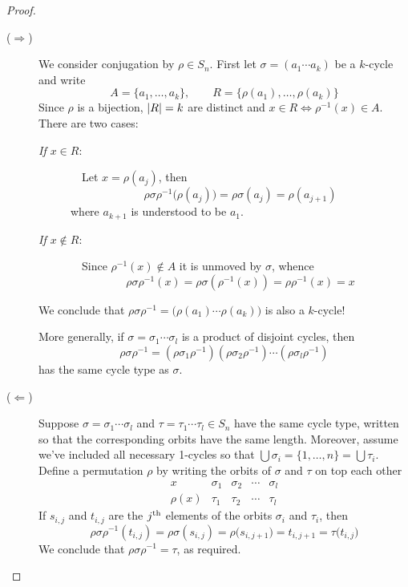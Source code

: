 \begin{proof}
\begin{description}
	\item[\normalfont($\Rightarrow$)] We consider conjugation by $\rho\in S_n$. First let $\sigma=(a_1\cdots a_k)$ be a $k$-cycle and write
	\[A=\{a_1,\ldots,a_k\},\qquad R=\{\rho(a_1),\ldots,\rho(a_k)\}\]
	Since $\rho$ is a bijection, $\left| R\right|=k$ are distinct and $x\in R\iff \rho^{-1}(x)\in A$. There are two cases:
	\begin{description}
		\item[\normalfont\emph{If $x\in R$}:] \ \ Let $x=\rho(a_j)$, then
		\[\rho\sigma\rho^{-1}\bigl(\rho(a_j)\bigr)=\rho\sigma(a_j)=\rho(a_{j+1})\]
		where $a_{k+1}$ is understood to be $a_1$.
		\item[\normalfont\emph{If $x\not\in R$}:] \ \ Since $\rho^{-1}(x)\not\in A$ it is unmoved by $\sigma$, whence
		\[\rho\sigma\rho^{-1}(x) =\rho\sigma(\rho^{-1}(x))=\rho\rho^{-1}(x)=x\]
	\end{description}
	We conclude that $\rho\sigma\rho^{-1}=\bigl(\rho(a_1)\cdots\rho(a_k)\bigr)$	is also a $k$-cycle!\par
	More generally, if $\sigma=\sigma_1\cdots\sigma_l$ is a product of disjoint cycles, then
	\[\rho\sigma\rho^{-1}=(\rho\sigma_1\rho^{-1})(\rho\sigma_2\rho^{-1})\cdots (\rho\sigma_l\rho^{-1})\]
	has the same cycle type as $\sigma$.
	\item[\normalfont($\Leftarrow$)] Suppose $\sigma=\sigma_1\cdots\sigma_l$ and $\tau=\tau_1\cdots\tau_l\in S_n$ have the same cycle type, written so that the corresponding orbits have the same length. Moreover, assume we've included all necessary 1-cycles so that $\bigcup\sigma_i=\{1,\ldots,n\}=\bigcup\tau_i$. Define a permutation $\rho$ by writing the orbits of $\sigma$ and $\tau$ on top each other
\[\begin{array}{l|cccccccc}
      x&\sigma_1 &\sigma_2 & \cdots & \sigma_l\\\hline
      \rho(x)&\tau_1 & \tau_2 & \cdots & \tau_l
      \end{array}\]
If $s_{i,j}$ and $t_{i,j}$ are the $j\textsuperscript{th}$ elements of the orbits $\sigma_i$ and $\tau_i$, then
	\[\rho\sigma\rho^{-1}(t_{i,j})=\rho\sigma(s_{i,j})=\rho\bigl(s_{i,j+1}\bigr)=t_{i,j+1}=\tau\bigl(t_{i,j}\bigr)\]
	We conclude that $\rho\sigma\rho^{-1}=\tau$, as required.\qedhere
\end{description}
\end{proof}

\goodbreak

